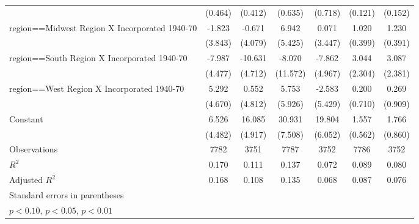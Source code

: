 \begin{table}[htbp]
\begin{tabular}{l*{6}{c}}
                    &     (0.464)         &     (0.412)         &     (0.635)         &     (0.718)         &     (0.121)         &     (0.152)         \\
[1em]
region==Midwest Region X Incorporated 1940-70&      -1.823         &      -0.671         &       6.942         &       0.071         &       1.020\sym{**} &       1.230\sym{***}\\
                    &     (3.843)         &     (4.079)         &     (5.425)         &     (3.447)         &     (0.399)         &     (0.391)         \\
[1em]
region==South Region X Incorporated 1940-70&      -7.987\sym{*}  &     -10.631\sym{**} &      -8.070         &      -7.862         &       3.044         &       3.087         \\
                    &     (4.477)         &     (4.712)         &    (11.572)         &     (4.967)         &     (2.304)         &     (2.381)         \\
[1em]
region==West Region X Incorporated 1940-70&       5.292         &       0.552         &       5.753         &      -2.583         &       0.200         &       0.269         \\
                    &     (4.670)         &     (4.812)         &     (5.926)         &     (5.429)         &     (0.710)         &     (0.909)         \\
[1em]
Constant            &       6.526         &      16.085\sym{***}&      30.931\sym{***}&      19.804\sym{***}&       1.557\sym{***}&       1.766\sym{**} \\
                    &     (4.482)         &     (4.917)         &     (7.508)         &     (6.052)         &     (0.562)         &     (0.860)         \\
\hline
Observations        &        7782         &        3751         &        7787         &        3752         &        7786         &        3752         \\
\(R^{2}\)           &       0.170         &       0.111         &       0.137         &       0.072         &       0.089         &       0.080         \\
Adjusted \(R^{2}\)  &       0.168         &       0.108         &       0.135         &       0.068         &       0.087         &       0.076         \\
\hline\hline
\multicolumn{7}{l}{\footnotesize Standard errors in parentheses}\\
\multicolumn{7}{l}{\footnotesize \sym{*} \(p<0.10\), \sym{**} \(p<0.05\), \sym{***} \(p<0.01\)}\\
\end{tabular}
\end{table}
